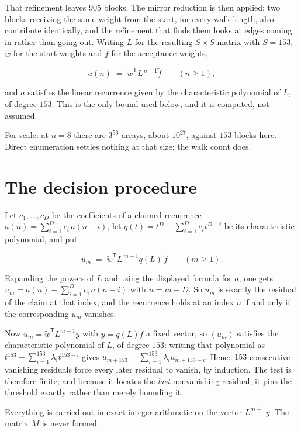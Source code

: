 \documentclass[11pt]{article}
\theoremstyle{definition}
\begin{document}
That refinement leaves $905$ blocks. The mirror reduction is then applied: two blocks receiving the same weight from the start, for every walk length, also contribute identically, and the refinement that finds them looks at edges coming in rather than going out. Writing $L$ for the resulting $S \times S$ matrix with $S = 153$, $\tilde w$ for the start weights and $\tilde f$ for the acceptance weights,

\[a(n) \;=\; \tilde w^{\mathsf T} L^{\,n-1} \tilde f \qquad (n \ge 1),\]

and $a$ satisfies the linear recurrence given by the characteristic polynomial of $L$, of degree $153$. This is the only bound used below, and it is computed, not assumed.

For scale: at $n = 8$ there are $3^{56}$ arrays, about $10^{27}$, against $153$ blocks here. Direct enumeration settles nothing at that size; the walk count does.

\section{The decision procedure}

Let $c_1,\dots,c_D$ be the coefficients of a claimed recurrence $a(n) = \sum_{i=1}^{D} c_i\,a(n-i)$, let $q(t) = t^{D} - \sum_{i=1}^{D} c_i t^{D-i}$ be its characteristic polynomial, and put

\[u_m \;=\; \tilde w^{\mathsf T} L^{\,m-1} q(L)\,\tilde f \qquad (m \ge 1).\]

Expanding the powers of $L$ and using the displayed formula for $a$, one gets $u_m = a(n) - \sum_{i=1}^{D} c_i\,a(n-i)$ with $n = m + D$. So $u_m$ is exactly the residual of the claim at that index, and the recurrence holds at an index $n$ if and only if the corresponding $u_m$ vanishes.

Now $u_m = \tilde w^{\mathsf T} L^{m-1} y$ with $y = q(L)\tilde f$ a fixed vector, so $(u_m)$ satisfies the characteristic polynomial of $L$, of degree $153$: writing that polynomial as $t^{153} - \sum_{i=1}^{153} \lambda_i t^{153-i}$ gives $u_{m+153} = \sum_{i=1}^{153} \lambda_i u_{m+153-i}$. Hence $153$ consecutive vanishing residuals force every later residual to vanish, by induction. The test is therefore finite; and because it locates the {\itshape last} nonvanishing residual, it pins the threshold exactly rather than merely bounding it.

Everything is carried out in exact integer arithmetic on the vector $L^{m-1}y$. The matrix $M$ is never formed.
\end{document}
